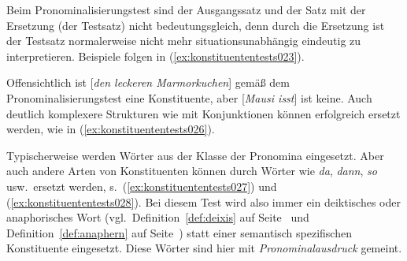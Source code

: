 
Beim Pronominalisierungstest sind der Ausgangssatz und der Satz mit der Ersetzung (der Testsatz) nicht bedeutungsgleich, denn durch die Ersetzung ist der Testsatz normalerweise nicht mehr situationsunabhängig eindeutig zu interpretieren.
Beispiele folgen in (\ref{ex:konstituententests023}).

\begin{exe}
  \ex\label{ex:konstituententests023}
  \begin{xlist}
  \end{xlist}
\end{exe}

Offensichtlich ist [\textit{den leckeren Marmorkuchen}] gemäß dem Pronominalisierungstest eine Konstituente, aber [\textit{Mausi isst}] ist keine.
Auch deutlich komplexere Strukturen wie mit Konjunktionen können erfolgreich ersetzt werden, wie in (\ref{ex:konstituententests026}).

\begin{exe}
\end{exe}

Typischerweise werden Wörter aus der Klasse der Pronomina eingesetzt.
Aber auch andere Arten von Konstituenten können durch Wörter wie \textit{da}, \textit{dann}, \textit{so} usw.\ ersetzt werden, s.\ (\ref{ex:konstituententests027}) und (\ref{ex:konstituententests028}).
Bei diesem Test wird also immer ein deiktisches oder anaphorisches Wort (vgl.\ Definition~\ref{def:deixis} auf Seite~\pageref{def:deixis} und Definition~\ref{def:anaphern} auf Seite~\pageref{def:anaphern}) statt einer semantisch spezifischen Konstituente eingesetzt.
Diese Wörter sind hier mit \textit{Pronominalausdruck} gemeint.

\begin{exe}
\end{exe}

